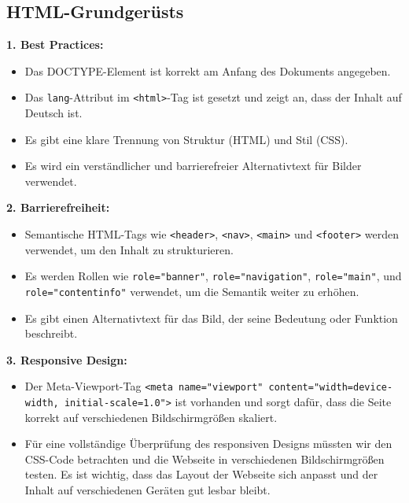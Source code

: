 \documentclass[12pt,a4paper]{scrartcl}
\newcommand{\tightlist}{
  \setlength{\itemsep}{0pt}\setlength{\parskip}{0pt}
}
\begin{document}
\hypertarget{html-grundgeruxfcsts}{%
\subsection{HTML-Grundgerüsts}\label{html-grundgeruxfcsts}}

\textbf{1. Best Practices:}

\begin{itemize}
\tightlist
\item
  Das DOCTYPE-Element ist korrekt am Anfang des Dokuments angegeben.
\item
  Das {\lstinline!lang!}-Attribut im
  {\lstinline!<html>!}-Tag ist gesetzt und zeigt an, dass
  der Inhalt auf Deutsch ist.
\item
  Es gibt eine klare Trennung von Struktur (HTML) und Stil (CSS).
\item
  Es wird ein verständlicher und barrierefreier Alternativtext für
  Bilder verwendet.
\end{itemize}

\textbf{2. Barrierefreiheit:}

\begin{itemize}
\tightlist
\item
  Semantische HTML-Tags wie {\lstinline!<header>!},
  {\lstinline!<nav>!}, {\lstinline!<main>!} und
  {\lstinline!<footer>!} werden verwendet, um den Inhalt zu
  strukturieren.
\item
  Es werden Rollen wie {\lstinline!role="banner"!},
  {\lstinline!role="navigation"!},
  {\lstinline!role="main"!}, und
  {\lstinline!role="contentinfo"!} verwendet, um die
  Semantik weiter zu erhöhen.
\item
  Es gibt einen Alternativtext für das Bild, der seine Bedeutung oder
  Funktion beschreibt.
\end{itemize}

\textbf{3. Responsive Design:}

\begin{itemize}
\tightlist
\item
  Der Meta-Viewport-Tag
  {\lstinline!<meta name="viewport" content="width=device-width, initial-scale=1.0">!}
  ist vorhanden und sorgt dafür, dass die Seite korrekt auf
  verschiedenen Bildschirmgrößen skaliert.
\item
  Für eine vollständige Überprüfung des responsiven Designs müssten wir
  den CSS-Code betrachten und die Webseite in verschiedenen
  Bildschirmgrößen testen. Es ist wichtig, dass das Layout der Webseite
  sich anpasst und der Inhalt auf verschiedenen Geräten gut lesbar
  bleibt.
\end{itemize}
\end{document}
